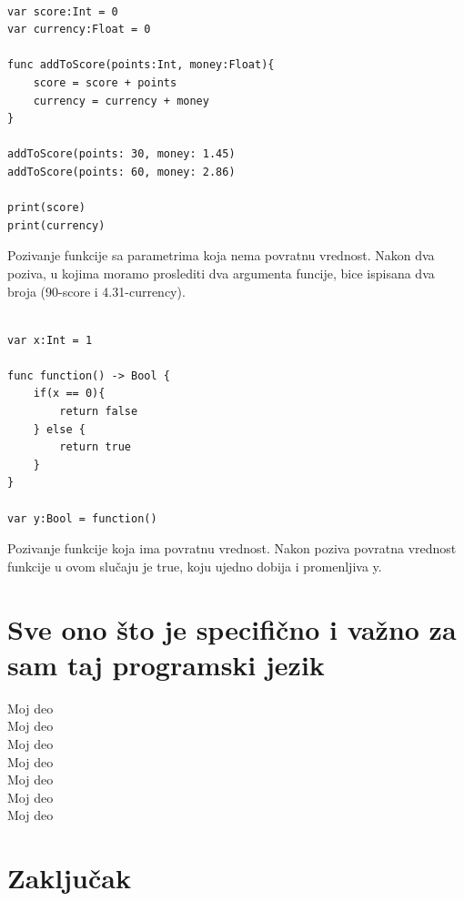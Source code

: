 \documentclass[a4paper]{article}
\begin{document}
\begin{lstlisting}[caption={},frame=single, label=simple]

var score:Int = 0
var currency:Float = 0

func addToScore(points:Int, money:Float){
	score = score + points
	currency = currency + money
}

addToScore(points: 30, money: 1.45)
addToScore(points: 60, money: 2.86)

print(score)
print(currency)

\end{lstlisting}

Pozivanje funkcije sa parametrima koja nema povratnu vrednost. Nakon dva poziva, u kojima moramo proslediti dva argumenta funcije, bice ispisana dva broja (90-score i 4.31-currency).\\


\begin{lstlisting}[caption={},frame=single, label=simple]

var x:Int = 1

func function() -> Bool {
	if(x == 0){
		return false
	} else {
		return true
	}
}

var y:Bool = function()

\end{lstlisting}

Pozivanje funkcije koja ima povratnu vrednost. Nakon poziva povratna vrednost funkcije u ovom slučaju je true, koju ujedno dobija i promenljiva y.\\






\section{Sve ono što je specifično i važno za sam taj programski jezik}	
\label{sec:sedmiDeo}

Moj deo \\
Moj deo \\
Moj deo \\
Moj deo \\
Moj deo \\
Moj deo \\
Moj deo \\




\section{Zaključak}
\label{sec:zakljucak}
\end{document}
